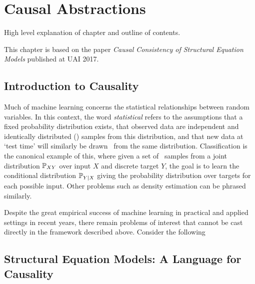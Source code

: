 \chapter{Causal Abstractions}

\ifpdf
    \graphicspath{{Chapter3/Figs/Raster/}{Chapter3/Figs/PDF/}{Chapter3/Figs/}}
\else
    \graphicspath{{Chapter3/Figs/Vector/}{Chapter3/Figs/}}
\fi

High level explanation of chapter and outline of contents.

This chapter is based on the paper \emph{Causal Consistency of Structural Equation Models} published at UAI 2017.



\section{Introduction to Causality}

Much of machine learning concerns the statistical relationships between random variables. In this context, the word \emph{statistical} refers to the assumptions that a fixed probability distribution exists, that observed data are independent and identically distributed (\iid) samples from this distribution, and that new data at `test time' will similarly be drawn \iid~from the same distribution.
Classification is the canonical example of this, where given a set of \iid~samples from a joint distribution $\mathbb{P}_{XY}$ over input $X$ and discrete target $Y$, the goal is to learn the conditional distribution $\mathbb{P}_{Y|X}$ giving the probability distribution over targets for each possible input. Other problems such as density estimation can be phrased similarly.

Despite the great empirical success of machine learning in practical and applied settings in recent years, there remain problems of interest that cannot be cast directly in the framework described above. 
Consider the following 


\section{Structural Equation Models: A Language for Causality}
